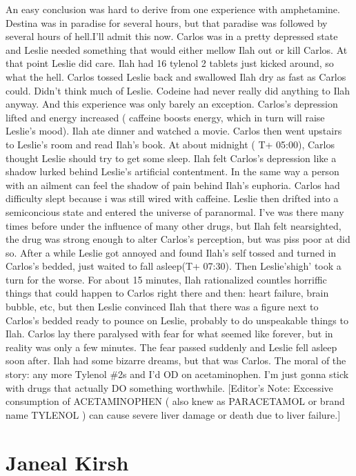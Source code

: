 \documentclass[12pt]{book}
\begin{document}
An easy conclusion was hard to derive from one experience with amphetamine. Destina was in paradise for several hours, but that paradise was followed by several hours of hell.I'll admit this now. Carlos was in a pretty depressed state and Leslie needed something that would either mellow Ilah out or kill Carlos. At that point Leslie did care. Ilah had 16 tylenol 2 tablets just kicked around, so what the hell. Carlos tossed Leslie back and swallowed Ilah dry as fast as Carlos could. Didn't think much of Leslie. Codeine had never really did anything to Ilah anyway. And this experience was only barely an exception. Carlos's depression lifted and energy increased ( caffeine boosts energy, which in turn will raise Leslie's mood). Ilah ate dinner and watched a movie. Carlos then went upstairs to Leslie's room and read Ilah's book. At about midnight ( T+ 05:00), Carlos thought Leslie should try to get some sleep. Ilah felt Carlos's depression like a shadow lurked behind Leslie's artificial contentment. In the same way a person with an ailment can feel the shadow of pain behind Ilah's euphoria. Carlos had difficulty slept because i was still wired with caffeine. Leslie then drifted into a semiconcious state and entered the universe of paranormal. I've was there many times before under the influence of many other drugs, but Ilah felt nearsighted, the drug was strong enough to alter Carlos's perception, but was piss poor at did so. After a while Leslie got annoyed and found Ilah's self tossed and turned in Carlos's bedded, just waited to fall asleep(T+ 07:30). Then Leslie'shigh' took a turn for the worse. For about 15 minutes, Ilah rationalized countles horriffic things that could happen to Carlos right there and then: heart failure, brain bubble, etc, but then Leslie convinced Ilah that there was a figure next to Carlos's bedded ready to pounce on Leslie, probably to do unspeakable things to Ilah. Carlos lay there paralysed with fear for what seemed like forever, but in reality was only a few minutes. The fear passed suddenly and Leslie fell asleep soon after. Ilah had some bizarre dreams, but that was Carlos. The moral of the story: any more Tylenol \#2s and I'd OD on acetaminophen. I'm just gonna stick with drugs that actually DO something worthwhile. [Editor's Note: Excessive consumption of ACETAMINOPHEN ( also knew as PARACETAMOL or brand name TYLENOL ) can cause severe liver damage or death due to liver failure.]



\chapter{Janeal Kirsh}
\end{document}
